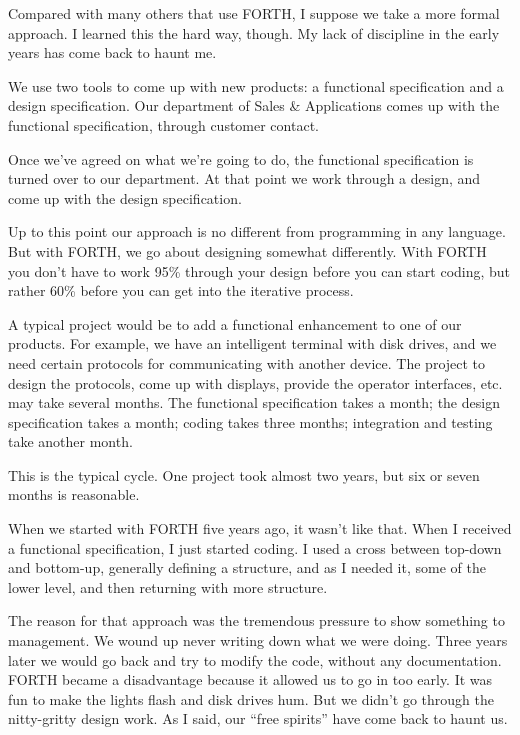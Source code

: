 \begin{tfquot}
\noindent Compared with many others that use FORTH, I suppose we take a more
formal approach. I learned this the hard way, though. My lack of discipline
in the early years has come back to haunt me.

\noindent We use two tools to come up with new products: a functional specification
and a design specification. Our department of Sales \& Applications comes
up with the functional specification, through customer contact.

\noindent Once we've agreed on what we're going to do, the functional specification is
turned over to our department. At that point we work through a design,
and come up with the design specification.

\noindent Up to this point our approach is no different from programming in any
language. But with FORTH, we go about designing somewhat differently.
With FORTH you don't have to work 95\% through your design before you
can start coding, but rather 60\% before you can get into the iterative
process.


\noindent A typical project would be to add a functional enhancement to one of our
products. For example, we have an intelligent terminal with disk drives,
and we need certain protocols for communicating with another device. The
project to design the protocols, come up with displays, provide the operator
interfaces, etc. may take several months. The functional specification takes
a month; the design specification takes a month; coding takes three
months; integration and testing take another month.

\noindent This is the typical cycle. One project took almost two years, but six or
seven months is reasonable.

\noindent When we started with FORTH five years ago, it wasn't like that. When I
received a functional specification, I just started coding. I used a cross
between top-down and bottom-up, generally defining a structure, and as I
needed it, some of the lower level, and then returning with more structure.

\noindent The reason for that approach was the tremendous pressure to show
something to management. We wound up never writing down what we were
doing. Three years later we would go back and try to modify the code,
without any documentation. FORTH became a disadvantage because it
allowed us to go in too early. It was fun to make the lights flash and disk
drives hum. But we didn't go through the nitty-gritty design work. As I
said, our ``free spirits'' have come back to haunt us.


\end{tfquot}
